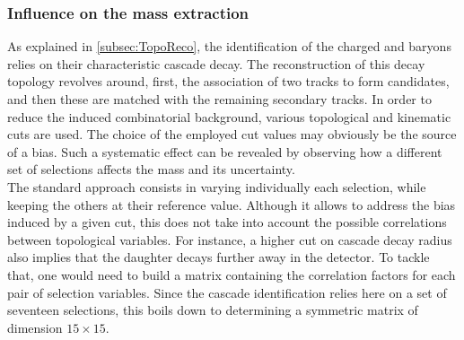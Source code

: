 \subsubsection{Influence on the mass extraction}
\label{subsubsec:SystTopoMass}

As explained in \Sec\ref{subsec:TopoReco}, the identification of the charged \rmXi and \rmOmega baryons relies on their characteristic cascade decay. The reconstruction of this decay topology revolves around, first, the association of two tracks to form \rmLambda candidates, and then these are matched with the remaining secondary tracks. In order to reduce the induced combinatorial background, various topological and kinematic cuts are used. The choice of the employed cut values may obviously be the source of a bias. Such a systematic effect can be revealed by observing how a different set of selections affects the mass and its uncertainty.\\

The standard approach consists in varying individually each selection, while keeping the others at their reference value. Although it allows to address the bias induced by a given cut, this does not take into account the possible correlations between topological variables. For instance, a higher cut on cascade decay radius also implies that the \rmLambda daughter decays further away in the detector. To tackle that, one would need to build a matrix containing the correlation factors for each pair of selection variables. Since the cascade identification relies here on a set of seventeen selections, this boils down to determining a symmetric matrix of dimension $15 \times 15$.

